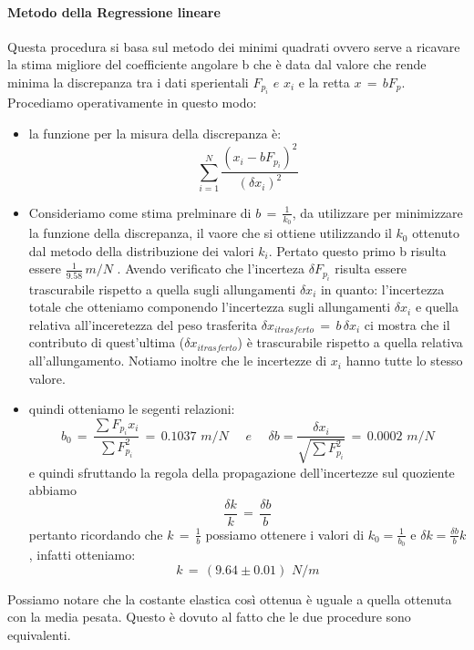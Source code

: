 \paragraph{Metodo della Regressione lineare\\}
Questa procedura si basa sul metodo dei minimi quadrati ovvero serve a ricavare la stima migliore del coefficiente angolare b che è data dal valore che rende minima la discrepanza tra i dati sperientali $F_{p_i} \,\,e\,\, x_i$ e la retta $x \,=\, bF_p$.\\
Procediamo operativamente in questo modo:
\begin{itemize}
	\item{la funzione per la misura della discrepanza è:
			\begin{equation*}
				\sum_{i=1}^{N} \frac{(x_i - bF_{p_i})^2}{(\delta x_i)^2}	
			\end{equation*}}
	\item{Consideriamo come stima prelminare di $b \,=\, \frac{1}{k_0}$, da utilizzare per minimizzare la funzione della discrepanza, il vaore che si ottiene utilizzando il $k_0$ ottenuto dal metodo della distribuzione dei valori $k_i$. Pertato questo primo b risulta essere $\frac{1}{9.58} \, m/N$ . Avendo verificato che l'incerteza $\delta F_{p_i}$ risulta essere trascurabile rispetto a quella sugli allungamenti $\delta x_i$ in quanto: l'incertezza totale che otteniamo componendo l'incertezza sugli allungamenti $\delta x_i$ e quella relativa all'inceretezza del peso trasferita $\delta x_{i trasferto} \,=\, b \, \delta x_i $ ci mostra che il contributo di quest'ultima ($\delta x_{i trasferto}$) è trascurabile rispetto a quella relativa all'allungamento. Notiamo inoltre che le incertezze di $x_i$ hanno tutte lo stesso valore.}
	\item{quindi otteniamo le segenti relazioni:
			\begin{equation*}
				b_0  \,=\,  \frac{\sum F_{p_i}  x_i}{\sum F_{p_i}^2} \,=\, 0.1037 \,\, m/N \quad \,\, e \quad\,\,
				\delta b  =  \frac{\delta x_i}{\sqrt{\sum F_{p_i}^2}} \,=\, 0.0002 \,\, m/N
			\end{equation*}
			e quindi sfruttando la regola della propagazione dell'incertezze sul quoziente abbiamo
			\begin{equation*}
				\frac{\delta k}{k} \,=\, \frac{\delta b}{b}
			\end{equation*}
			pertanto ricordando che $k \,=\, \frac{1}{b}$ possiamo ottenere i valori di $k_0 = \frac{1}{b_0}$ e $\delta k = \frac{\delta b}{b} k$, infatti otteniamo:
			\begin{equation*}
				k \,=\, (9.64 \pm 0.01) \,\,N/m
			\end{equation*}
			}
\end{itemize}
Possiamo notare che la costante elastica così ottenua è uguale a quella ottenuta con la media pesata. Questo è dovuto al fatto che le due procedure sono equivalenti.

